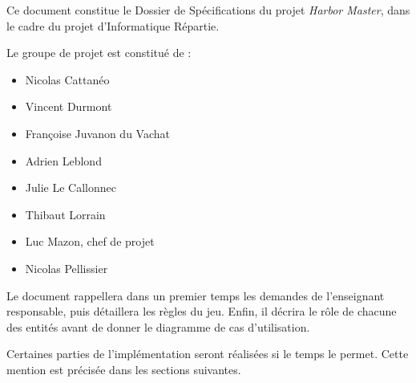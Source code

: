 Ce document constitue le Dossier de Spécifications du projet \emph{Harbor Master}, dans le cadre du projet d'Informatique Répartie.

Le groupe de projet est constitué de :
\begin{itemize}
	\item Nicolas Cattanéo
	\item Vincent Durmont
	\item Françoise Juvanon du Vachat
	\item Adrien Leblond
	\item Julie Le Callonnec
	\item Thibaut Lorrain
	\item Luc Mazon, chef de projet
	\item Nicolas Pellissier
\end{itemize}
\vspace{0.4cm}

Le document rappellera dans un premier temps les demandes de l'enseignant responsable, puis détaillera les règles du jeu. Enfin, il décrira le rôle de chacune des entités avant de donner le diagramme de cas d'utilisation.

Certaines parties de l'implémentation seront réalisées si le temps le permet. Cette mention est précisée dans les sections suivantes.